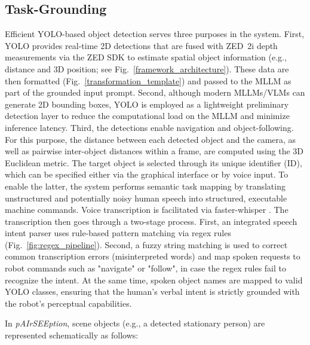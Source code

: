 \documentclass[lettersize,journal]{IEEEtran}
\begin{document}
\subsection{Task-Grounding} \label{taskgrounding}
Efficient YOLO-based object detection serves three purposes in the system. First, YOLO provides real-time 2D detections that are fused with ZED~2i depth measurements via the ZED SDK to estimate spatial object information (e.g., distance and 3D position; see Fig.~\ref{framework_architecture}). These data are then formatted (Fig.~\ref{transformation_template}) and passed to the MLLM as part of the grounded input prompt. Second, although modern MLLMs/VLMs can generate 2D bounding boxes, YOLO is employed as a lightweight preliminary detection layer to reduce the computational load on the MLLM and minimize inference latency. Third, the detections enable navigation and object-following. For this purpose, the distance between each detected object and the camera, as well as pairwise inter-object distances within a frame, are computed using the 3D Euclidean metric. The target object is selected through its unique identifier (ID), which can be specified either via the graphical interface or by voice input.
To enable the latter, the system performs semantic task mapping by translating unstructured and potentially noisy human speech into structured, executable machine commands. Voice transcription is facilitated via faster-whisper \cite{fasterwhisper}. The transcription then goes through a two-stage process. First, an integrated speech intent parser uses rule-based pattern matching via regex rules (Fig.~\ref{fig:regex_pipeline}). Second, a fuzzy string matching is used to correct common transcription errors (misinterpreted words) and map spoken requests to robot commands such as "navigate" or "follow", in case the regex rules fail to recognize the intent. At the same time, spoken object names are mapped to valid YOLO classes, ensuring that the human’s verbal intent is strictly grounded with the robot’s perceptual capabilities.

In \textit{pAIrSEEption}, scene objects (e.g., a detected stationary person) are represented schematically as follows:
\end{document}
